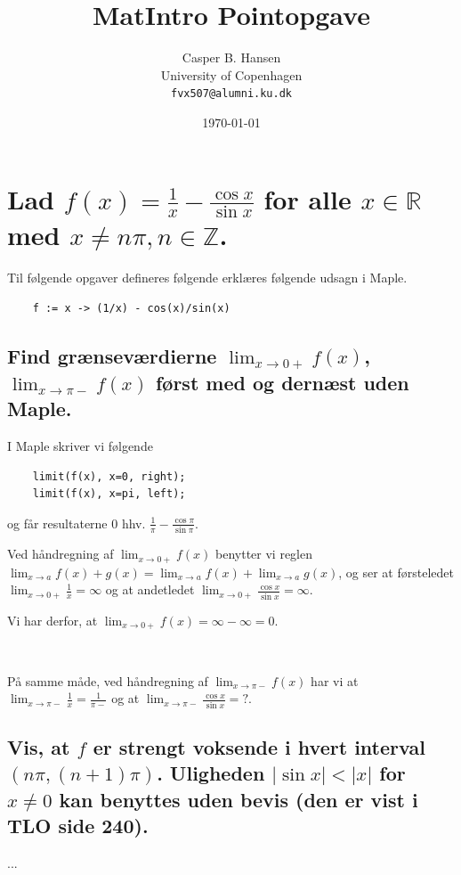 \documentclass[11pt,a4paper]{article}
\title{MatIntro Pointopgave \assignmentnumber}
\author
{
    Casper B. Hansen\\
    University of Copenhagen\\
    {\tt fvx507@alumni.ku.dk}
}
\date{\today}
\newcommand{\modulus}[1]{\lvert#1\rvert}
\newcommand{\limit}[2]{\lim_{#1 \rightarrow #2}}
\begin{document}


\section
{
    \mdseries
    Lad $f(x) = \frac{1}{x} - \frac{\cos x}{\sin x}$ for alle $x \in
    \mathbb{R}$ med $x \neq n\pi, n \in \mathbb{Z}$.
}
Til følgende opgaver defineres følgende erklæres følgende udsagn i Maple.
\begin{lstlisting}
    f := x -> (1/x) - cos(x)/sin(x)
\end{lstlisting}

\subsection
{
    \mdseries
    Find grænseværdierne $\limit{x}{0+} f(x)$, $\limit{x}{\pi-} f(x)$ først
    med og dernæst uden Maple.
}
I Maple skriver vi følgende
\begin{lstlisting}
    limit(f(x), x=0, right);
    limit(f(x), x=pi, left);
\end{lstlisting}
og får resultaterne $0$ hhv. $\frac{1}{\pi} - \frac{\cos \pi}{\sin \pi}$.

\begin{multicols}{2}
    Ved håndregning af $\limit{x}{0+} f(x)$ benytter vi reglen $\limit{x}{a}
    f(x) + g(x) = \limit{x}{a} f(x) + \limit{x}{a} g(x)$, og ser at
    førsteledet $\limit{x}{0+} \frac{1}{x} = \infty$ og at andetledet
    $\limit{x}{0+} \frac{\cos x}{\sin x} = \infty$.
    
    Vi har derfor, at $\limit{x}{0+} f(x) = \infty - \infty = 0$.
    
    \vfill{\ }\columnbreak

    På samme måde, ved håndregning af $\limit{x}{\pi-} f(x)$ har vi at
    $\limit{x}{\pi-} \frac{1}{x} = \frac{1}{\pi-}$ og at $\limit{x}{\pi-}
    \frac{\cos x}{\sin x} = ?$.

\end{multicols}

\subsection
{
    \mdseries
    Vis, at $f$ er strengt voksende i hvert interval $(n\pi,(n+1)\pi)$.
    Uligheden $\modulus{\sin x} < \modulus{x}$ for $x \neq 0$ kan benyttes
    uden bevis (den er vist i TLO side 240).
}
...
\end{document}
